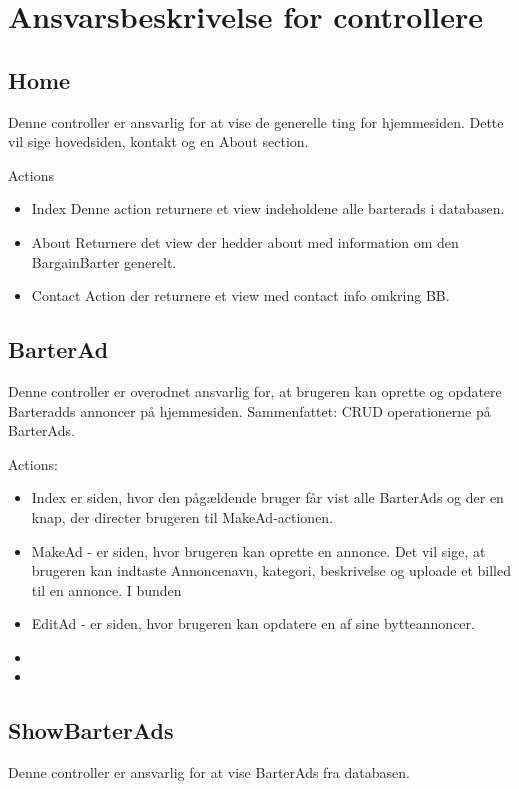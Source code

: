 \chapter{Ansvarsbeskrivelse for controllere}\label{ch:Controllere}

\section{Home}
Denne controller er ansvarlig for at vise de generelle ting for hjemmesiden. Dette vil sige hovedsiden, kontakt og en About section.  

Actions
\begin{itemize}
	\item Index
	Denne action returnere et view indeholdene alle barterads i databasen. 
	\item About
	Returnere det view der hedder about med information om den BargainBarter generelt.
	\item Contact
	Action der returnere et view med contact info omkring BB.
\end{itemize}


\section{BarterAd}
Denne controller er overodnet ansvarlig for, at brugeren kan oprette og opdatere Barteradds annoncer på hjemmesiden. Sammenfattet: CRUD operationerne på BarterAds.

Actions:
\begin{itemize}
	\item Index er siden, hvor den pågældende bruger får vist alle BarterAds og der en knap, der directer brugeren til MakeAd-actionen.
	\item MakeAd - er siden, hvor brugeren kan oprette en annonce. Det vil sige, at brugeren kan indtaste Annoncenavn, kategori, beskrivelse og uploade et billed til en annonce. I bunden
	\item EditAd - er siden, hvor brugeren kan opdatere en af sine bytteannoncer.
	\item 
	\item
\end{itemize}

\section{ShowBarterAds}
Denne controller er ansvarlig for at vise BarterAds fra databasen.

